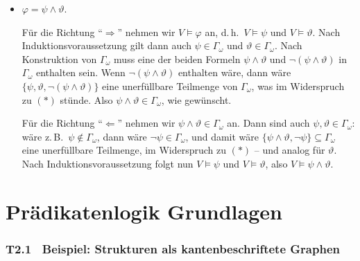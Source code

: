 \documentclass[fontsize=11pt, twoside=false, numbers=autoenddot]{scrbook}
\begin{document}
\begin{beweis}
\begin{description}
\begin{itemize}
        \item
          $\varphi = \psi \land \vartheta$.
          \par
          Für die Richtung "`$\Rightarrow$"' nehmen wir $V \models \varphi$ an,
          d.\,h.\ $V \models \psi$ und $V \models \vartheta$.
          Nach Induktionsvoraussetzung gilt dann auch $\psi \in \Gamma_\omega$ und $\vartheta \in \Gamma_\omega$.
          Nach Konstruktion von $\Gamma_\omega$ muss eine der beiden Formeln $\psi \land \vartheta$
          und $\lnot(\psi \land \vartheta)$ in $\Gamma_\omega$ enthalten sein.
          Wenn $\lnot(\psi \land \vartheta)$ enthalten wäre,
          dann wäre $\{\psi,\vartheta,\lnot(\psi \land \vartheta)\}$ eine unerfüllbare Teilmenge von $\Gamma_\omega$,
          was im Widerspruch zu $(*)$ stünde.
          Also $\psi \land \vartheta \in \Gamma_\omega$, wie gewünscht.
          \par
          Für die Richtung "`$\Leftarrow$"' nehmen wir $\psi \land \vartheta \in \Gamma_\omega$ an.
          Dann sind auch $\psi,\vartheta \in \Gamma_\omega$:
          wäre z.\,B.\ $\psi \notin \Gamma_\omega$, dann wäre
          $\lnot\psi \in \Gamma_\omega$, und damit wäre
          $\{\psi \land \vartheta,\lnot\psi\} \subseteq \Gamma_\omega$
          eine unerfüllbare Teilmenge, im Widerspruch zu $(*)$ -- und analog für $\vartheta$.
          Nach Induktionsvoraussetzung folgt nun $V \models \psi$ und $V \models \vartheta$,
          also $V \models \psi \land \vartheta$.\qedhere
      \end{itemize}
  \end{description}
\end{beweis}%


\part{Prädikatenlogik Grundlagen}

\section*{T2.1~ Beispiel: Strukturen als kantenbeschriftete Graphen}
\end{document}
